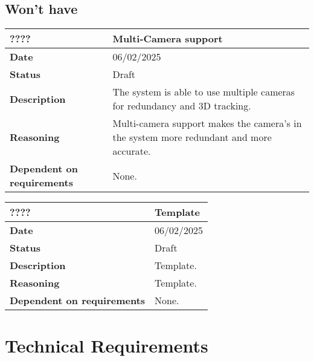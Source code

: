 \documentclass{article}
\begin{document}
\subsection{Won't have}
\begin{table}[H]
    \renewcommand{\arraystretch}{1.3}
    \begin{tabular}{|l|p{10cm}|}
        \hline
        \rowcolor{gray!50}
        \textbf{????} & \textbf{Multi-Camera support} \\ \hline
        \textbf{Date} & 06/02/2025 \\ \hline
        \textbf{Status} & Draft \\ \hline
        \textbf{Description} & The system is able to use multiple cameras for redundancy and 3D tracking. \\ \hline
        \textbf{Reasoning} & Multi-camera support makes the camera's in the system more redundant and more accurate. \\ \hline
        \textbf{Dependent on requirements} & None. \\ \hline
    \end{tabular}
\end{table}

\begin{table}[H]
    \renewcommand{\arraystretch}{1.3}
    \begin{tabular}{|l|p{10cm}|}
        \hline
        \rowcolor{gray!50}
        \textbf{????} & \textbf{Template} \\ \hline
        \textbf{Date} & 06/02/2025 \\ \hline
        \textbf{Status} & Draft \\ \hline
        \textbf{Description} & Template. \\ \hline
        \textbf{Reasoning} & Template. \\ \hline
        \textbf{Dependent on requirements} & None. \\ \hline
    \end{tabular}
\end{table}

\newpage

\section{Technical Requirements}
\end{document}
